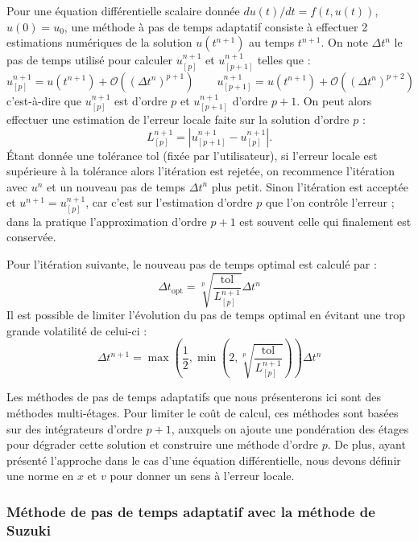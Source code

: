Pour une équation différentielle scalaire donnée $du(t)/dt = f(t, u(t))$, $u(0)=u_0$, une méthode à pas de temps adaptatif consiste à effectuer 2 estimations numériques de la solution $u(t^{n+1})$ au temps $t^{n+1}$. On note $\Delta t^n$ le pas de temps utilisé pour calculer $u^{n+1}_{[p]}$ et $u^{n+1}_{[p+1]}$ telles que :
$$
  u^{n+1}_{[p]} = u(t^{n+1}) + \mathcal{O}((\Delta t^n)^{p+1}) \qquad u^{n+1}_{[p+1]} = u(t^{n+1}) + \mathcal{O}((\Delta t^n)^{p+2})
$$
c'est-à-dire que $u^{n+1}_{[p]}$ est d'ordre $p$ et $u^{n+1}_{[p+1]}$ d'ordre $p+1$. On peut alors effectuer une estimation de l'erreur locale faite sur la solution d'ordre $p$ :
\begin{equation}
  L_{[p]}^{n+1} =  |u^{n+1}_{[p+1]} - u^{n+1}_{[p]}|. 
  \label{eq:Lerror}
\end{equation}
Étant donnée une tolérance $\text{tol}$ (fixée par l'utilisateur), si l'erreur locale est supérieure à la tolérance alors l'itération est rejetée, on recommence l'itération avec $u^n$ et un nouveau pas de temps $\Delta t^n$ plus petit. Sinon l'itération est acceptée et $u^{n+1} = u^{n+1}_{[p]}$, car c'est sur l'estimation d'ordre $p$ que l'on contrôle l'erreur ; dans la pratique l'approximation d'ordre $p+1$ est souvent celle qui finalement est conservée.

Pour l’itération suivante, le nouveau pas de temps optimal est calculé par :
\begin{equation}
  \Delta t_\text{opt} = \sqrt[p]{\frac{\text{tol}}{L_{[p]}^{n+1}}}\Delta t^n
  \label{eq:dtopt}
\end{equation}
Il est possible de limiter l'évolution du pas de temps optimal en évitant une trop grande volatilité de celui-ci :
$$
  \Delta t^{n+1} = \max\left(\frac{1}{2},\min\left(2,\sqrt[p]{\frac{\text{tol}}{L_{[p]}^{n+1}}}\right)\right)\Delta t^n
$$

Les méthodes de pas de temps adaptatifs que nous présenterons ici sont des méthodes multi-étages. Pour limiter le coût de calcul, ces méthodes sont basées sur des intégrateurs d'ordre $p+1$, auxquels on ajoute une pondération des étages pour dégrader cette solution et construire une méthode d'ordre $p$. De plus, ayant présenté l'approche dans le cas d'une équation différentielle, nous devons définir une norme en $x$ et $v$ pour donner un sens à l'erreur locale.  


\subsubsection{Méthode de pas de temps adaptatif avec la méthode de Suzuki}

